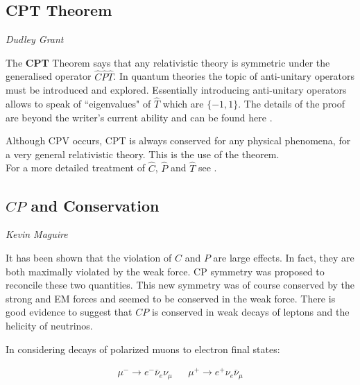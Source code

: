 \subsection{CPT Theorem}
\vspace{-1.0em}
\begin{center}
\tiny{\textit{Dudley Grant}}
\end{center}

The \textbf{CPT} Theorem says that any relativistic theory is symmetric under the generalised operator $\hat{C}\hat{P}\hat{T}$. In quantum theories the topic of anti-unitary operators must be introduced and explored. Essentially introducing anti-unitary operators allows to speak of ``eigenvalues" of $\hat{T}$ which are $\{-1,1\}$. The details of the proof are beyond the writer's current ability and can be found here \cite{CPT}.

Although CPV occurs, CPT is always conserved for any physical phenomena, for a very general relativistic theory. This is the use of the theorem.\\

For a more detailed treatment of $\hat{C}$, $\hat{P}$ and $\hat{T}$ see \cite{Martin+Shaw}.

\subsection{$CP$ and Conservation}
\vspace{-1.0em}
\begin{center}
\tiny{\textit{Kevin Maguire}}
\end{center}

It has been shown that the violation of $C$ and $P$ are large effects. In fact, they are both maximally violated by the weak force. CP symmetry was proposed to reconcile these two quantities. This new symmetry was of course conserved by the strong and EM forces and seemed to be conserved in the weak force. There is good evidence to suggest that $CP$ is conserved in weak decays of leptons and the helicity of neutrinos.

In considering decays of polarized muons to electron final states:

\begin{align*}
\mu^{-} \rightarrow e^{-} \bar{\nu}_{e} \nu_{\mu} & & \mu^{+} \rightarrow e^{+} \nu_{e} \bar{\nu}_{\mu} \\ 
\end{align*}

